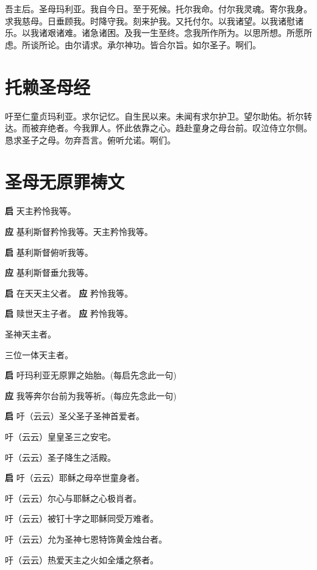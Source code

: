 \documentclass[UTF8,17pt]{ctexart}
\begin{document}
吾主后。圣母玛利亚。我⾃今⽇。⾄于死候。托尔我命。付尔我灵魂。寄尔我⾝。求我慈母。⽇垂顾我。时降守我。刻来护我。又托付尔。以我诸望。以我诸慰诸乐。以我诸艰诸难。诸急诸困。及我⼀⽣⾄终。念我所作所为。以思所想。所愿所虑。所谈所论。由尔请求。承尔神功。皆合尔旨。如尔圣⼦。啊们。

\section{托赖圣母经}

吁⾄仁童贞玛利亚。求尔记忆。⾃⽣民以来。未闻有求尔护卫。望尔助佑。祈尔转达。⽽被弃绝者。今我罪⼈。怀此依靠之⼼。趋赴童⾝之母台前。叹泣侍⽴尔侧。恳求圣⼦之母。勿弃吾⾔。俯听允诺。啊们。

\section{圣母⽆原罪祷⽂}

\textbf{启} \quad 天主矜怜我等。

\textbf{应} \quad 基利斯督矜怜我等。天主矜怜我等。

\textbf{启} \quad 基利斯督俯听我等。

\textbf{应} \quad 基利斯督垂允我等。

\textbf{启} \quad 在天天主⽗者。 \hfill \textbf{应} \quad 矜怜我等。

\textbf{启} \quad 赎世天主⼦者。 \hfill \textbf{应} \quad 矜怜我等。

 圣神天主者。

 三位⼀体天主者。

\textbf{启} \quad 吁玛利亚⽆原罪之始胎。(每启先念此⼀句)

\textbf{应} \quad 我等奔尔台前为我等祈。(每应先念此⼀句)

\textbf{启} \quad 吁（云云）圣⽗圣⼦圣神⾸爱者。 

 吁（云云）皇皇圣三之安宅。

 吁（云云）圣⼦降⽣之活殿。

\textbf{启} \quad 吁（云云）耶稣之母卒世童⾝者。

 吁（云云）尔⼼与耶稣之⼼极肖者。

 吁（云云）被钉⼗字之耶稣同受万难者。

 吁（云云）允为圣神七恩特饰黄⾦烛台者。

 吁（云云）热爱天主之⽕如全燔之祭者。
\end{document}
